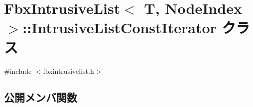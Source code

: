 \hypertarget{class_fbx_intrusive_list_1_1_intrusive_list_const_iterator}{}\section{Fbx\+Intrusive\+List$<$ T, Node\+Index $>$\+:\+:Intrusive\+List\+Const\+Iterator クラス}
\label{class_fbx_intrusive_list_1_1_intrusive_list_const_iterator}


{\ttfamily \#include $<$fbxintrusivelist.\+h$>$}

\subsection*{公開メンバ関数}
